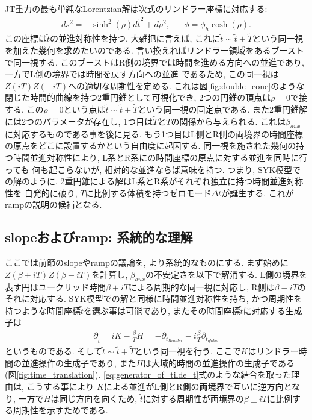 JT重力の最も単純なLorentzian解は次式のリンドラー座標に対応する:
\begin{align}
	ds^2 = -\sinh^2(\rho)d\tilde{t}^2 + d\rho^2,\hspace{20pt}
	\phi = \phi_h\cosh(\rho).
	\label{eq:Rindler_coordinate}
\end{align}
この座標は$\tilde{t}$の並進対称性を持つ. 
大雑把に言えば, これに$\tilde{t}\sim\tilde{t}+\tilde{T}$という同一視を加えた幾何を求めたいのである. 
言い換えればリンドラー領域をあるブーストで同一視する. 
このブーストはR側の境界では時間を進める方向への並進であり, 一方でL側の境界では時間を戻す方向への並進
であるため, この同一視は$Z(iT)Z(-iT)$への適切な周期性を定める. 
これは図\ref{fig:double_cone}のような閉じた時間的曲線を持つ2重円錐として可視化でき, 
2つの円錐の頂点は$\rho = 0$で接する. 
この$\rho = 0$という点は$\tilde{t}\sim\tilde{t}+\tilde{T}$という同一視の固定点である. 
また2重円錐解には2つのパラメータが存在し, 1つ目は$\tilde{T}$と$T$の関係から与えられる. 
これは$\beta_{aux}$に対応するものである事を後に見る. 
もう1つ目はL側とR側の両境界の時間座標の原点をどこに設置するかという自由度に起因する. 
同一視を施された幾何の持つ時間並進対称性により, L系とR系にの時間座標の原点に対する並進を同時に行っても
何も起こらないが, 相対的な並進ならば意味を持つ. 
つまり, SYK模型での解のように, 2重円錐による解はL系とR系がそれぞれ独立に持つ時間並進対称性を
自発的に破り, $T$に比例する体積を持つゼロモード$\Delta t$が誕生する. 
これがrampの説明の候補となる. 

\subsection{slopeおよびramp: 系統的な理解}
ここでは前節のslopeやrampの議論を, より系統的なものにする. 
まず始めに$Z(\beta + iT)Z(\beta - iT)$を計算し, $\beta_{aux}$の不安定さを以下で解消する. 
L側の境界を表す円はユークリッド時間$\beta + iT$による周期的な同一視に対応し, 
R側は$\beta - iT$のそれに対応する. 
SYK模型での解と同様に時間並進対称性を持ち, かつ周期性を持つような時間座標$\tilde{t}$を選ぶ事は可能であり, 
またその時間座標$\tilde{t}$に対応する生成子は
\begin{align}
	\partial_{\tilde{t}}
	= iK - \frac{\beta}{T}H
	= -\partial_{t_{Rindler}} - i\frac{\beta}{T}\partial_{t_{global}}
	\label{eq:generator_of_tilde_t}
\end{align}
というものである. 
そして$\tilde{t}\sim\tilde{t} + \tilde{T}$という同一視を行う. 
ここで$K$はリンドラー時間の並進操作の生成子であり, また$H$は大域的時間の並進操作の生成子である
(図\ref{fig:time_translation}). 
\eqref{eq:generator_of_tilde_t}式のような結合を取った理由は, こうする事により
$K$による並進がL側とR側の両境界で互いに逆方向となり, 一方で$H$は同じ方向を向くため, 
$\tilde{t}$に対する周期性が両境界の$\beta \pm iT$に比例する周期性を示すためである. 

